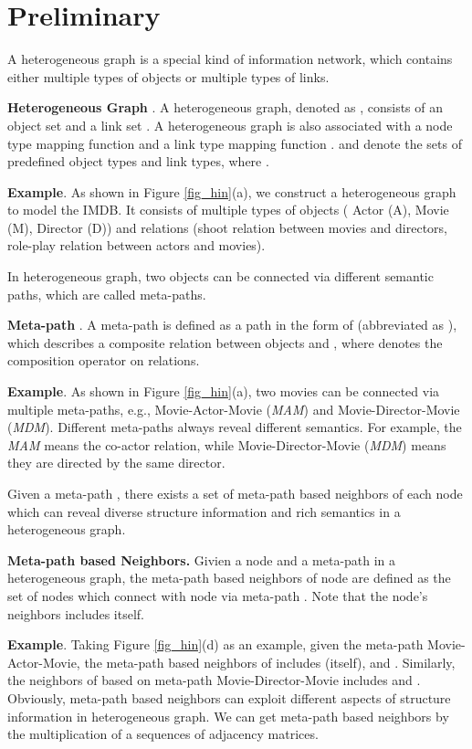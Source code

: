 \section{Preliminary}
A heterogeneous  graph is a special kind of information network, which contains either multiple types of objects or multiple types of links. 


\begin{definition}{\textbf{ Heterogeneous  Graph }\cite{sun2013mining}.}
	A  heterogeneous graph, denoted as , consists of an object set  and a link set .
A heterogeneous graph is also associated with a node type mapping function  and 
	a link type mapping function .  and  denote 
	the sets of predefined object types and link types, where .
\end{definition}

\textbf{Example}. As shown in Figure \ref{fig_hin}(a), we construct a heterogeneous graph to model the IMDB. It consists of multiple types of objects ( Actor (A), Movie (M), Director (D))  and relations (shoot relation between movies and directors, role-play relation between actors and movies). 






In heterogeneous graph, two objects can be connected via different semantic paths, which are called meta-paths.
\begin{definition}{\textbf{Meta-path }\cite{sun2011pathsim}.}
A meta-path  is defined as a path in the form of  (abbreviated as ), which describes a composite relation  between objects  and , where  denotes the composition operator on relations.
\end{definition}





\textbf{Example}. As shown in Figure \ref{fig_hin}(a), two movies can be connected via multiple meta-paths, e.g., Movie-Actor-Movie (\emph{MAM}) and Movie-Director-Movie (\emph{MDM}). Different meta-paths always reveal different semantics. For example, the \emph{MAM} means the co-actor relation, while Movie-Director-Movie (\emph{MDM}) means they are directed by the same director.


Given a meta-path , there exists a set of meta-path based neighbors of each node which can reveal diverse structure information and rich semantics in a heterogeneous graph. 
\begin{definition}\textbf{Meta-path based Neighbors.}
	Givien a node  and a meta-path  in a heterogeneous graph, the meta-path based neighbors  of node  are defined as the set of nodes which connect with node  via meta-path . Note that the node's neighbors includes itself.
\end{definition}
\textbf{Example}. Taking Figure \ref{fig_hin}(d) as an example, given the meta-path Movie-Actor-Movie, the meta-path based neighbors of  includes  (itself),  and . Similarly, the neighbors of  based on meta-path Movie-Director-Movie includes  and  . Obviously, meta-path based neighbors can exploit different aspects of structure information in heterogeneous graph. We can get meta-path based neighbors by
the multiplication of a sequences of adjacency matrices.


